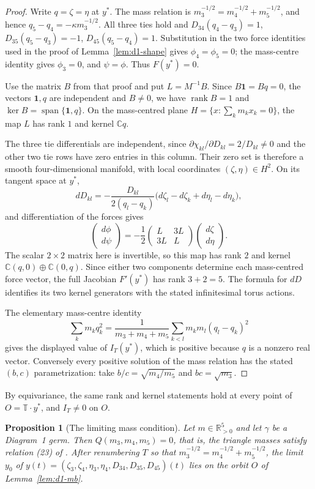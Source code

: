 \documentclass[11pt]{amsart}
\newtheorem{proposition}[theorem]{Proposition}
\theoremstyle{definition}
\theoremstyle{remark}
\newcommand{\C}{\mathbb{C}}
\newcommand{\Rp}{\mathbb{R}_{>0}}
\begin{document}
{\begin{proof}
Write $q=\zeta=\eta$ at $y^*$.  The mass relation is
$m_3^{-1/2}=m_4^{-1/2}+m_5^{-1/2}$, and hence
$q_5-q_4=-\kappa m_3^{-1/2}$.  All three ties hold and
$D_{34}(q_4-q_3)=1$, $D_{35}(q_5-q_3)=-1$,
$D_{45}(q_5-q_4)=1$.
Substitution in the two force identities used in the proof of
Lemma~\ref{lem:d1-shape} gives $\phi_4=\phi_5=0$; the mass-centre identity
gives $\phi_3=0$, and $\psi=\phi$.  Thus $F(y^*)=0$.

Use the matrix $B$ from that proof and put $L=M^{-1}B$.
Since $B\mathbf1=Bq=0$, the vectors $\mathbf1,q$ are independent and
$B\ne0$, we have $\operatorname{rank}B=1$ and
$\ker B=\operatorname{span}\{\mathbf1,q\}$.
On the mass-centred plane
$H=\{x:\sum_km_kx_k=0\}$, the map $L$ has rank $1$ and kernel $\C q$.

The three tie differentials are independent, since
$\partial\chi_{kl}/\partial D_{kl}=2/D_{kl}\ne0$ and the other two
tie rows have zero entries in this column.  Their zero set is therefore
a smooth four-dimensional manifold, with local coordinates $(\zeta,\eta)\in H^2$.
On its tangent space at $y^*$,
\[
 dD_{kl}=-\frac{D_{kl}}{2(q_l-q_k)}
   \bigl(d\zeta_l-d\zeta_k+d\eta_l-d\eta_k\bigr),
\]
and differentiation of the forces gives
\[
 \begin{pmatrix}d\phi\\d\psi\end{pmatrix}
 =-\frac12
 \begin{pmatrix}L&3L\\3L&L\end{pmatrix}
 \begin{pmatrix}d\zeta\\d\eta\end{pmatrix}.
\]
The scalar $2\times2$ matrix here is invertible, so this map has rank $2$
and kernel $\C(q,0)\oplus\C(0,q)$.  Since either two components determine
each mass-centred force vector, the full Jacobian $F'(y^*)$ has rank
$3+2=5$.  The formula for $dD$ identifies its two kernel generators with
the stated infinitesimal torus actions.

The elementary mass-centre identity
\[
 \sum_km_kq_k^2=\frac1{m_3+m_4+m_5}
       \sum_{k<l}m_km_l(q_l-q_k)^2
\]
gives the displayed value of $I_T(y^*)$, which is positive because $q$ is
a nonzero real vector.  Conversely every positive solution of the mass
relation has the stated $(b,c)$ parametrization: take
$b/c=\sqrt{m_4/m_5}$ and $bc=\sqrt{m_3}$.
\end{proof}
By equivariance, the same rank and kernel statements hold at every point of
$O=\mathbb T\cdot y^*$, and $I_T\ne0$ on $O$.

}\begin{proposition}[The limiting mass condition]\label{prop:d1-first}
Let $m\in\Rp^5$ and let $\gamma$ be a Diagram~1 germ.  Then $Q(m_3,m_4,m_5)=0$, that is, the
triangle masses satisfy relation (23) of \cite[\S8.1]{AK}.  After renumbering $T$ so that
$m_3^{-1/2}=m_4^{-1/2}+m_5^{-1/2}$, the limit $y_0$ of
$y(t)=(\zeta_3,\zeta_4,\eta_3,\eta_4,D_{34},D_{35},D_{45})(t)$ lies on the orbit $O$ of
Lemma~\ref{lem:d1-mb}.
\end{proposition}
\end{document}
